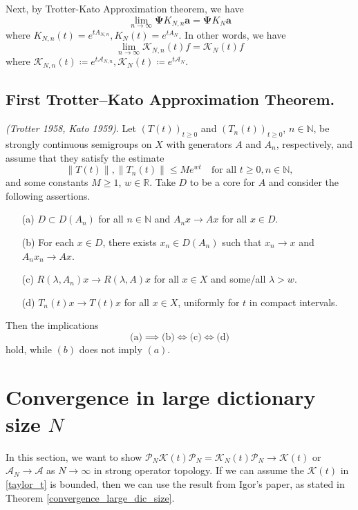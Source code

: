 \documentclass{article}[11]
\begin{document}
	Next, by Trotter-Kato Approximation theorem, we have 
	$$\lim_{n\to\infty} \mathbf{\Psi}K_{N,n} \mathbf{a} = \mathbf{\Psi}K_N \mathbf{a}$$ 
	where $K_{N,n}(t) = e^{t A_{N,n}}, K_{N}(t) = e^{t A_N}$. In other words, we have
	$$
	\lim_{n\to\infty}\mathcal{K}_{N,n}(t) f = \mathcal{K}_{N}(t) f
	$$ where $\mathcal{K}_{N,n}(t)\coloneqq e^{t \mathcal{A}_{N,n}}, \mathcal{K}_{N}(t)\coloneqq e^{t \mathcal{A}_N}$.
	
	\subsection*{First Trotter--Kato Approximation Theorem.} 
	\textit{(Trotter 1958, Kato 1959)}. Let $(T(t))_{t\geq0}$ and $(T_n(t))_{t\geq0}$, $n \in \mathbb{N}$, be strongly continuous semigroups on $X$ with generators $A$ and $A_n$, respectively, and assume that they satisfy the estimate
	\[
	\|T(t)\|, \|T_n(t)\| \leq Me^{wt} \quad \text{for all } t \geq 0, n \in \mathbb{N},
	\]
	and some constants $M \geq 1$, $w \in \mathbb{R}$. Take $D$ to be a core for $A$ and consider the following assertions.
	\begin{itemize}
		\item[(a)] $D \subset D(A_n)$ for all $n \in \mathbb{N}$ and $A_n x \to A x$ for all $x \in D$.
		\item[(b)] For each $x \in D$, there exists $x_n \in D(A_n)$ such that $x_n \to x$ and $A_n x_n \to A x$.
		\item[(c)] $R(\lambda, A_n)x \to R(\lambda, A)x$ for all $x \in X$ and some/all $\lambda > w$.
		\item[(d)] $T_n(t)x \to T(t)x$ for all $x \in X$, uniformly for $t$ in compact intervals.
	\end{itemize}
	Then the implications
	\[
	\text{(a)} \implies \text{(b)} \iff \text{(c)} \iff \text{(d)}
	\]
	hold, while $(b)$ does not imply $(a)$.
	
	
	
	
	\newpage
	\section{Convergence in large dictionary size $N$}
	In this section, we want to show $\mathcal{P}_N\mathcal{K}(t)\mathcal{P}_N = \mathcal{K}_{N}(t)\mathcal{P}_N \to \mathcal{K}(t)$ or $\mathcal{A}_N \to \mathcal{A}$ as $N \to \infty$ in strong operator topology. If we can assume the $\mathcal{K}(t)$ in \eqref{taylor_t} is bounded, then we can use the result from Igor's paper, as stated in Theorem \ref{convergence_large_dic_size}.
	
\end{document}
